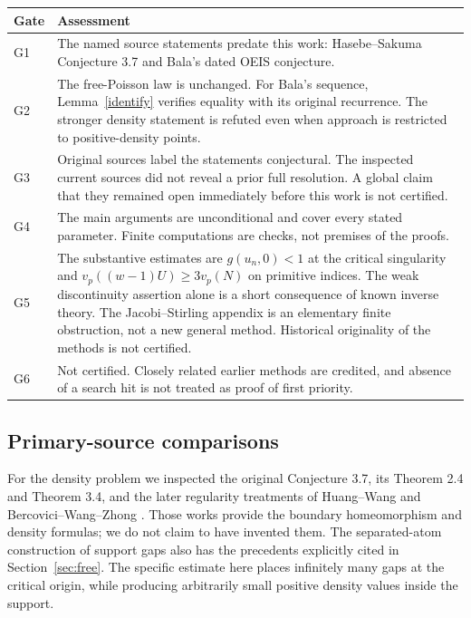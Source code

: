 \documentclass[11pt,a4paper]{article}
\numberwithin{equation}{section}
\begin{document}
\begin{center}\small
\begin{tabular}{@{}p{}p{}@{}}
\toprule
Gate & Assessment\\
\midrule
G1 & The named source statements predate this work: Hasebe--Sakuma
Conjecture 3.7 and Bala's dated OEIS conjecture.\\[4pt]
G2 & The free-Poisson law is unchanged. For Bala's sequence,
Lemma~\ref{identify} verifies equality with its original recurrence.
The stronger density statement is refuted even when approach is
restricted to positive-density points.\\[4pt]
G3 & Original sources label the statements conjectural. The inspected
current sources did not reveal a prior full resolution. A global claim
that they remained open immediately before this work is not certified.\\[4pt]
G4 & The main arguments are unconditional and cover every stated
parameter. Finite computations are checks, not premises of the proofs.\\[4pt]
G5 & The substantive estimates are $g(u_n,0)<1$ at the critical
singularity and $v_p((w-1)U)\ge3v_p(N)$ on primitive indices.
The weak discontinuity assertion alone is a short consequence of known
inverse theory. The Jacobi--Stirling appendix is an elementary finite
obstruction, not a new general method. Historical originality of the
methods is not certified.\\[4pt]
G6 & Not certified. Closely related earlier methods are credited,
and absence of a search hit is not treated as proof of first priority.\\
\bottomrule
\end{tabular}
\end{center}

\subsection{Primary-source comparisons}
For the density problem we inspected the original Conjecture 3.7,
its Theorem 2.4 and Theorem 3.4, and the later regularity treatments
of Huang--Wang \cite{HW} and Bercovici--Wang--Zhong \cite{BWZ}.
Those works provide the boundary homeomorphism and density formulas;
we do not claim to have invented them. The separated-atom construction
of support gaps also has the precedents explicitly cited in
Section~\ref{sec:free}. The specific estimate here places infinitely
many gaps at the critical origin, while producing arbitrarily small
positive density values inside the support.
\end{document}
